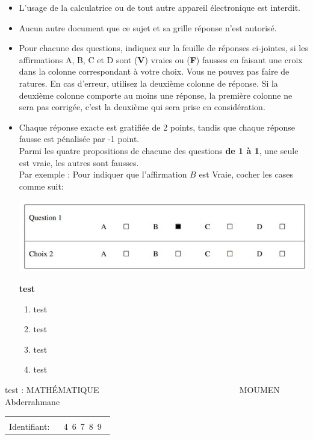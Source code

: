 \documentclass{book}%
\begin{document}
\begin{itemize}%
\item%
L'usage de la calculatrice ou de tout autre appareil électronique est interdit.%
\item%
Aucun autre document que ce sujet et sa grille réponse n'est autorisé.%
\item%
Pour chacune des questions, indiquez sur la feuille de réponses ci-jointes, si les affirmations A, B, C et D sont (\textbf{V}) vraies ou (\textbf{F}) fausses en faisant une croix dans la colonne correspondant à votre choix. Vous ne pouvez pas faire de ratures. En cas d'erreur, utilisez la deuxième colonne de réponse. Si la deuxième colonne comporte au moins une réponse, la première colonne ne sera pas corrigée, c'est la deuxième qui sera prise en considération.%
\item%
Chaque réponse exacte est gratifiée de 2 points, tandis que chaque réponse fausse est pénalisée par -1 point. \\ 	Parmi les quatre propositions de chacune des questions \textbf{de 1 à 1}, une seule est vraie, les autres sont fausses. \\ 	Par exemple : Pour indiquer que l'affirmation $B$ est Vraie, cocher les cases comme suit:  \\ \begin{center}	\includegraphics[scale=0.8]{reponses.png} \end{center}%
\thispagestyle{empty}%
\begin{exercise}%
\textbf{test }%
\begin{enumerate}[label=\textbf{\Alph*. }]%
\item%
test%
\item%
test%
\item%
test%
\item%
test%
\end{enumerate}%
\end{exercise}%
\end{itemize}%
\newpage%
\thispagestyle{empty}%
test : MATHÉMATIQUE $\qquad \qquad \qquad \qquad \qquad \qquad \qquad \qquad$ MOUMEN Abderrahmane%
\begin{flushright}%
\begin{tabular}{|l|}%
\hline%
 \\%
\thispagestyle{empty}%
Identifiant: $\quad$ {\Large 4~6~7~8~9~}%
 \\%
\hline%
\end{tabular}%
\end{flushright}%
\end{document}

